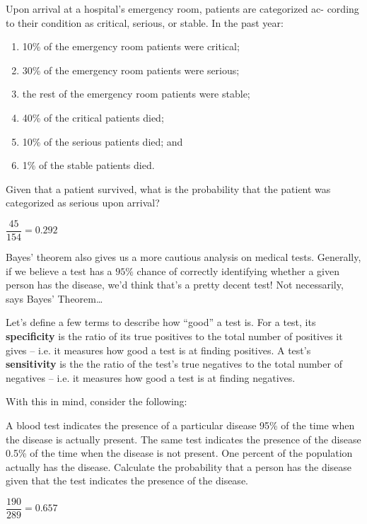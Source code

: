 \documentclass[../main.tex]{subfiles}
\begin{document}
\begin{example}[Hospital, 10.4]
	\noindent
	Upon arrival at a hospital’s emergency room, patients are categorized ac-
	cording to their condition as critical, serious, or stable. In the past year:
	\begin{enumerate}[label=(\alph*)]
	\setlength{\itemsep}{-0.5em}
	\item 10\% of the emergency room patients were critical;
	 \item 30\% of the emergency room patients were serious;
	\item the rest of the emergency room patients were stable;
	\item 40\% of the critical patients died;
	\item 10\% of the serious patients died; and
	\item 1\% of the stable patients died.
	\end{enumerate}
	Given that a patient survived, what is the probability that the patient was
	categorized as serious upon arrival?
\end{example}
\begin{solution}
$\dfrac{45}{154} = 0.292$
\end{solution}

Bayes' theorem also gives us a more cautious analysis on medical tests. Generally, if we believe a test has a $95\%$ chance of correctly identifying whether a given person has the disease, we'd think that's a pretty decent test! Not necessarily, says Bayes' Theorem\ldots

Let's define a few terms to describe how ``good'' a test is. For a test, its \textbf{specificity} is the ratio of its true positives to the total number of positives it gives -- i.e. it measures how good a test is at finding positives. A test's \textbf{sensitivity} is the the ratio of the test's true negatives to the total number of negatives -- i.e. it measures how good a test is at finding negatives.

With this in mind, consider the following: 
\begin{example}[Disease, 10.7]
A blood test indicates the presence of a particular disease 95\% of the time
when the disease is actually present. The same test indicates the presence of
the disease 0.5\% of the time when the disease is not present. One percent of
the population actually has the disease.
Calculate the probability that a person has the disease given that the test
indicates the presence of the disease.
\end{example}
\begin{solution}
	$\dfrac{190}{289} = 0.657$
\end{solution}
\end{document}
